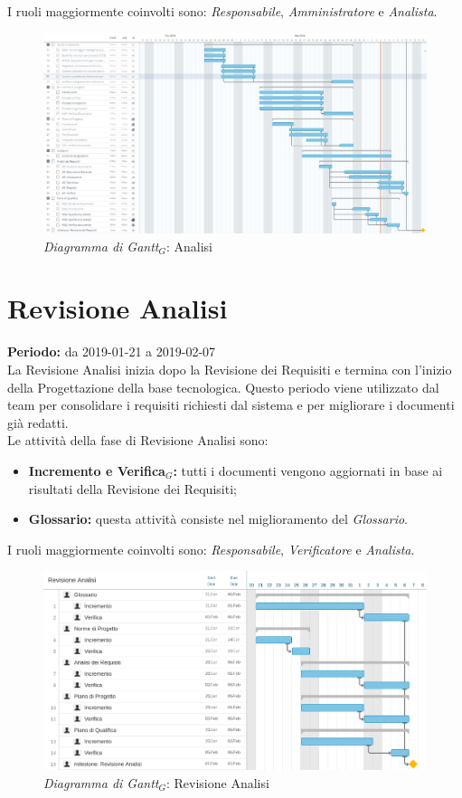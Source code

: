 I ruoli maggiormente coinvolti sono: \textit{Responsabile}, \textit{Amministratore} e \textit{Analista}.
\begin{figure} [h]
    \centering
    \includegraphics[scale=0.3]{./images/analisi.jpg}
    \caption{\textit{Diagramma di Gantt$_{G}$}: Analisi}\label{}
\end{figure}
\section{Revisione Analisi}
\textbf{Periodo:} da 2019-01-21 a 2019-02-07\\
La Revisione Analisi inizia dopo la Revisione dei Requisiti e termina con l’inizio della Progettazione della base tecnologica. Questo periodo viene utilizzato dal team per consolidare i requisiti richiesti dal sistema e per migliorare i documenti già redatti.\\
Le attività della fase di Revisione Analisi sono:
\begin{itemize}
    \item \textbf{Incremento e Verifica$_{G}$:} tutti i documenti vengono aggiornati in base ai risultati della Revisione dei Requisiti;
    \item \textbf{Glossario:} questa attività consiste nel miglioramento del \textit{Glossario}.
\end{itemize}
I ruoli maggiormente coinvolti sono: \textit{Responsabile}, \textit{Verificatore} e \textit{Analista}.
\begin{figure} [h]
    \centering
    \includegraphics[scale=0.2]{./images/revisione_analisi.jpg}
    \caption{\textit{Diagramma di Gantt$_{G}$}: Revisione Analisi }\label{}
\end{figure}
\newpage

